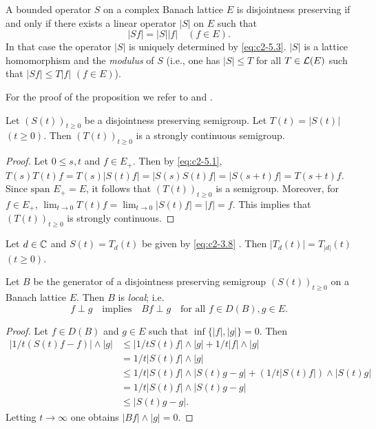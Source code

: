 \begin{proposition}\label{prop:c2-5.1}
A bounded operator $S$ on a complex Banach lattice $E$ is disjointness preserving if and only if there exists a linear operator $|S|$ on $E$ such that
\begin{equation}\label{eq:c2-5.3}
|Sf| = |S||f| \quad (f \in E).
\end{equation}
In that case the operator $|S|$ is uniquely determined by \eqref{eq:c2-5.3}.
$|S|$ is a lattice homomorphism and the \emph{modulus} of $S$ (i.e., one has
$|S| \leq T$ for all $T \in \mathcal{L}(E)$ such that $|Sf| \leq T|f|$ $(f \in E)$).
\end{proposition}

For the proof of the proposition we refer to \citet{arendt:1983} and \citet{depagter:1985}.

\begin{proposition}\label{prop:c2-5.2}
Let $(S(t))_{t \geq 0}$ be a disjointness preserving semigroup. 
Let $T(t) = |S(t)|$ $(t \geq 0)$. 
Then $(T(t))_{t \geq 0}$ is a strongly continuous semigroup.
\end{proposition}

\begin{proof}
Let $0 \leq s,t$ and $f \in E_{+}$. 
Then by \eqref{eq:c2-5.1}, $T(s)T(t)f = T(s)|S(t)f| = |S(s)S(t)f| = |S(s+t)f| = T(s+t)f$. 
Since $\text{span } E_{+} = E$, it follows that $(T(t))_{t \geq 0}$ is a semigroup. 
Moreover, for $f \in E_{+}$, $\lim_{t \to 0} T(t)f = \lim_{t \to 0} |S(t)f| = |f| = f$. 
This implies that $(T(t))_{t \geq 0}$ is strongly continuous.
\end{proof}
\begin{example}\label{ex:c2-5.3}
Let $d \in \mathbb{C}$ and $S(t) = T_{d}(t)$ be given by \ref{eq:c2-3.8}  . 
Then $|T_{d}(t)| = T_{|d|}(t)$ $(t \geq 0)$.
\end{example}

\begin{proposition}\label{prop:c2-5.4}
Let $B$ be the generator of a disjointness preserving semigroup $(S(t))_{t \geq 0}$ on a Banach lattice $E$. 
Then $B$ is \emph{local}; i.e.
\begin{equation}\label{eq:c2-5.4}
f \perp g \quad \text{implies} \quad Bf \perp g \quad \text{for all } f \in D(B), g \in E.
\end{equation}
\end{proposition}

\begin{proof}
Let $f \in D(B)$ and $g \in E$ such that $\inf\{|f|,|g|\} = 0$. 
Then
\begin{align*}
|1/t(S(t)f - f)| \wedge |g| &\leq |1/tS(t)f| \wedge |g| + 1/t|f| \wedge |g|\\
&= 1/t |S(t)f| \wedge |g|\\
&\leq 1/t |S(t)f| \wedge |S(t)g -g| + (1/t|S(t)f|) \wedge |S(t)g|\\
&= 1/t |S(t)f| \wedge |S(t)g - g|\\
&\leq |S(t)g - g|.
\end{align*}
Letting $t \to \infty$ one obtains $|Bf| \wedge |g| = 0$.
\end{proof}

